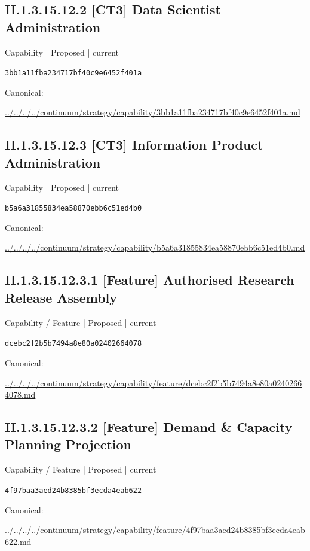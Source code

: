\documentclass[10pt,a4paper]{article}
\begin{document}
\subsection*{II.1.3.15.12.2 [CT3] Data Scientist Administration}
{\small Capability | Proposed | current}\par
\texttt{3bb1a11fba234717bf40c9e6452f401a}\par
Canonical: \par
{\footnotesize\url{../../../../continuum/strategy/capability/3bb1a11fba234717bf40c9e6452f401a.md}}\par
\subsection*{II.1.3.15.12.3 [CT3] Information Product Administration}
{\small Capability | Proposed | current}\par
\texttt{b5a6a31855834ea58870ebb6c51ed4b0}\par
Canonical: \par
{\footnotesize\url{../../../../continuum/strategy/capability/b5a6a31855834ea58870ebb6c51ed4b0.md}}\par
\subsection*{II.1.3.15.12.3.1 [Feature] Authorised Research Release Assembly}
{\small Capability / Feature | Proposed | current}\par
\texttt{dcebc2f2b5b7494a8e80a02402664078}\par
Canonical: \par
{\footnotesize\url{../../../../continuum/strategy/capability/feature/dcebc2f2b5b7494a8e80a02402664078.md}}\par
\subsection*{II.1.3.15.12.3.2 [Feature] Demand \& Capacity Planning Projection}
{\small Capability / Feature | Proposed | current}\par
\texttt{4f97baa3aed24b8385bf3ecda4eab622}\par
Canonical: \par
{\footnotesize\url{../../../../continuum/strategy/capability/feature/4f97baa3aed24b8385bf3ecda4eab622.md}}\par
\end{document}
